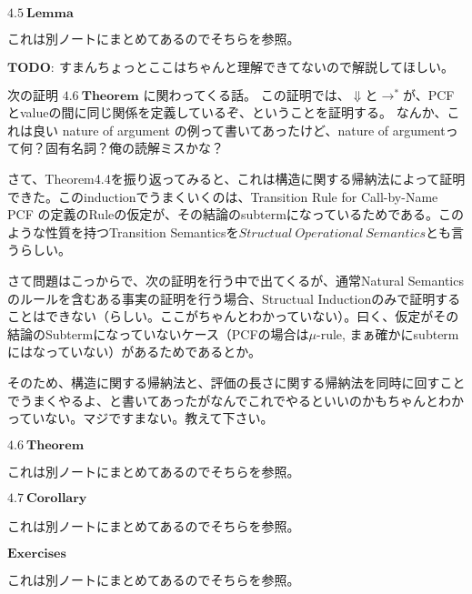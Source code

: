 \documentclass[9pt,fleqn]{jarticle}
\begin{document}
\nl

$\bm{4.5\ Lemma}$

これは別ノートにまとめてあるのでそちらを参照。

\nl
\nl
$\bm{TODO:\ すまんちょっとここはちゃんと理解できてないので解説してほしい。}$
\nl

次の証明 $\bm{4.6\ Theorem}$ に関わってくる話。
この証明では、$\Downarrow$と$\rightarrow^{*}$が、PCFとvalueの間に同じ関係を定義しているぞ、ということを証明する。
なんか、これは良い nature of argument の例って書いてあったけど、nature of argumentって何？固有名詞？俺の読解ミスかな？
\nl

さて、Theorem4.4を振り返ってみると、これは$\bm{構造に関する帰納法}$によって証明できた。このinductionでうまくいくのは、Transition Rule for Call-by-Name PCF の定義のRuleの仮定が、その結論のsubtermになっているためである。このような性質を持つTransition Semanticsを$Structual\ Operational\ Semantics$とも言うらしい。

さて問題はこっからで、次の証明を行う中で出てくるが、通常Natural Semanticsのルールを含むある事実の証明を行う場合、Structual Inductionのみで証明することはできない（らしい。ここがちゃんとわかっていない）。曰く、仮定がその結論のSubtermになっていないケース（PCFの場合は$\mu$-rule, まぁ確かにsubtermにはなっていない）があるためであるとか。

そのため、構造に関する帰納法と、評価の長さに関する帰納法を同時に回すことでうまくやるよ、と書いてあったがなんでこれでやるといいのかもちゃんとわかっていない。マジですまない。教えて下さい。

\nl

\nl
$\bm{4.6\ Theorem}$
\nl

これは別ノートにまとめてあるのでそちらを参照。

\nl
$\bm{4.7\ Corollary}$
\nl

これは別ノートにまとめてあるのでそちらを参照。

\nl
$\bm{Exercises}$

これは別ノートにまとめてあるのでそちらを参照。
\end{document}
